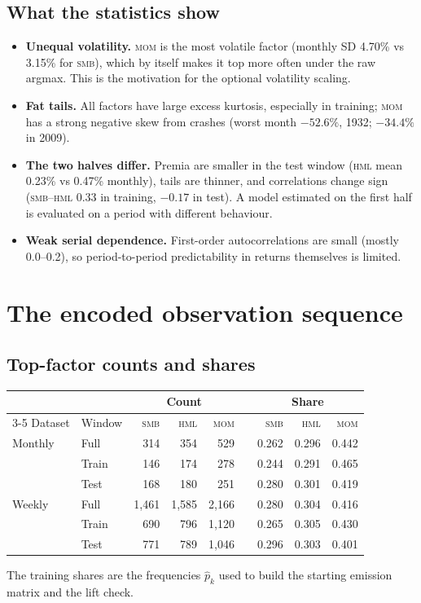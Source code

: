 \documentclass[11pt]{article}
\newcommand{\SMB}{\textsc{smb}}
\newcommand{\HML}{\textsc{hml}}
\newcommand{\MOM}{\textsc{mom}}
\begin{document}
\subsection{What the statistics show}
\begin{itemize}
\item \textbf{Unequal volatility.} \MOM{} is the most volatile factor (monthly SD 4.70\% vs 3.15\% for \SMB), which by itself makes it top more often under the raw argmax. This is the motivation for the optional volatility scaling.
\item \textbf{Fat tails.} All factors have large excess kurtosis, especially in training; \MOM{} has a strong negative skew from crashes (worst month $-52.6\%$, 1932; $-34.4\%$ in 2009).
\item \textbf{The two halves differ.} Premia are smaller in the test window (\HML{} mean 0.23\% vs 0.47\% monthly), tails are thinner, and correlations change sign (\SMB--\HML{} 0.33 in training, $-0.17$ in test). A model estimated on the first half is evaluated on a period with different behaviour.
\item \textbf{Weak serial dependence.} First-order autocorrelations are small (mostly 0.0--0.2), so period-to-period predictability in returns themselves is limited.
\end{itemize}

\section{The encoded observation sequence}\label{sec:encoding}

\subsection{Top-factor counts and shares}
\begin{center}
\begin{tabular}{ll rrr c rrr}
\toprule
 & & \multicolumn{3}{c}{Count} && \multicolumn{3}{c}{Share} \\
\cmidrule{3-5}\cmidrule{7-9}
Dataset & Window & \SMB & \HML & \MOM && \SMB & \HML & \MOM \\
\midrule
Monthly & Full & 314 & 354 & 529 && 0.262 & 0.296 & 0.442 \\
 & Train & 146 & 174 & 278 && 0.244 & 0.291 & 0.465 \\
 & Test & 168 & 180 & 251 && 0.280 & 0.301 & 0.419 \\
\midrule
Weekly & Full & 1{,}461 & 1{,}585 & 2{,}166 && 0.280 & 0.304 & 0.416 \\
 & Train & 690 & 796 & 1{,}120 && 0.265 & 0.305 & 0.430 \\
 & Test & 771 & 789 & 1{,}046 && 0.296 & 0.303 & 0.401 \\
\bottomrule
\end{tabular}
\end{center}
The training shares are the frequencies $\hat p_k$ used to build the starting emission matrix and the lift check.
\end{document}

